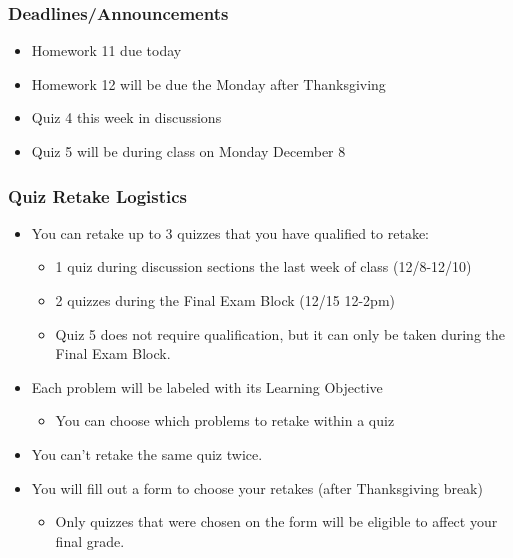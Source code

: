 
\begin{frame}
    \frametitle{Deadlines/Announcements}
\begin{itemize}
            \item Homework 11 due today
            \item Homework 12 will be due the Monday after Thanksgiving
            \item Quiz 4 this week in discussions
            \item Quiz 5 will be during class on Monday December 8
        \end{itemize}
\end{frame}

\begin{frame}
\frametitle{Quiz Retake Logistics}
\begin{itemize}
    \item You can retake up to 3 quizzes that you have qualified to retake:
    \begin{itemize}
        \item 1 quiz during discussion sections the last week of class (12/8-12/10)
        \item 2 quizzes during the Final Exam Block (12/15 12-2pm)
        \item Quiz 5 does not require qualification, but it can only be taken during the Final Exam Block.
    \end{itemize}\pause
    \item Each problem will be labeled with its Learning Objective
    \begin{itemize}
        \item You can choose which problems to retake within a quiz
    \end{itemize}\pause
    \item You can't retake the same quiz twice.\pause
    \item You will fill out a form to choose your retakes (after Thanksgiving break)
    \begin{itemize}
        \item Only quizzes that were chosen on the form will be eligible to affect your final grade.
    \end{itemize}
\end{itemize}
\end{frame}

